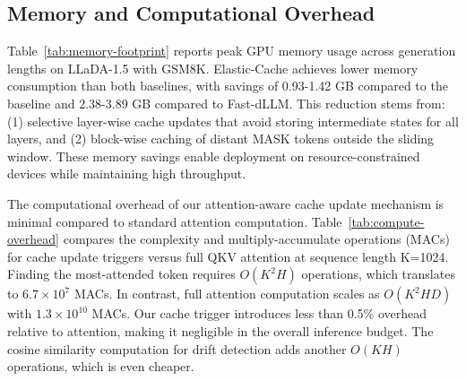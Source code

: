 \documentclass{article} %
\theoremstyle{definition}
\theoremstyle{remark}
\begin{document}
\subsection{Memory and Computational Overhead}

Table~\ref{tab:memory-footprint} reports peak GPU memory usage across generation lengths on LLaDA-1.5 with GSM8K. Elastic-Cache achieves lower memory consumption than both baselines, with savings of 0.93-1.42 GB compared to the baseline and 2.38-3.89 GB compared to Fast-dLLM. This reduction stems from: (1) selective layer-wise cache updates that avoid storing intermediate states for all layers, and (2) block-wise caching of distant MASK tokens outside the sliding window. These memory savings enable deployment on resource-constrained devices while maintaining high throughput.

\begin{table}[h]
\centering
\caption{Peak GPU memory footprint (GB) on LLaDA-1.5, GSM8K across generation lengths.}
\label{tab:memory-footprint}
\vspace{-0.1in}
\vspace{-0.1in}
\end{table}

The computational overhead of our attention-aware cache update mechanism is minimal compared to standard attention computation. Table~\ref{tab:compute-overhead} compares the complexity and multiply-accumulate operations (MACs) for cache update triggers versus full QKV attention at sequence length K=1024. Finding the most-attended token requires $O(K^2H)$ operations, which translates to $6.7 \times 10^7$ MACs. In contrast, full attention computation scales as $O(K^2HD)$ with $1.3 \times 10^{10}$ MACs. Our cache trigger introduces less than 0.5\% overhead relative to attention, making it negligible in the overall inference budget. The cosine similarity computation for drift detection adds another $O(KH)$ operations, which is even cheaper.
\end{document}
